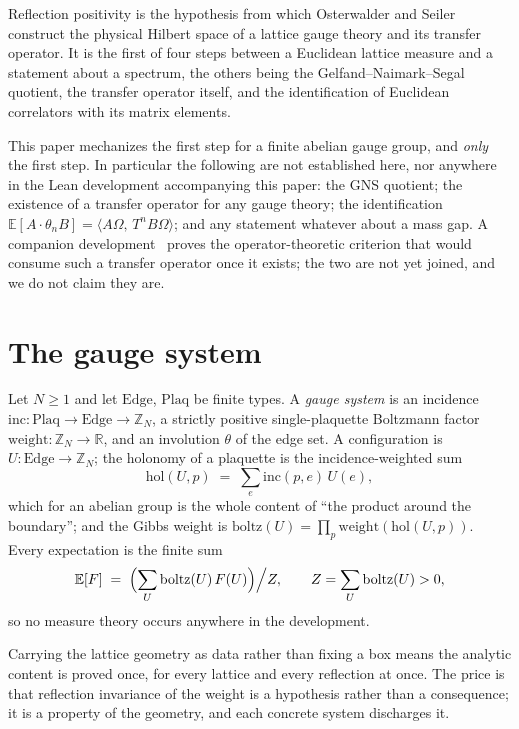 \documentclass[11pt]{article}
\theoremstyle{definition}
\newcommand{\R}{\mathbb{R}}
\newcommand{\Z}{\mathbb{Z}}
\newcommand{\inn}[2]{\langle #1,\, #2\rangle}
\begin{document}
Reflection positivity is the hypothesis from which Osterwalder and
Seiler~\cite{OsterwalderSeiler} construct the physical Hilbert space of a
lattice gauge theory and its transfer operator.  It is the first of four steps
between a Euclidean lattice measure and a statement about a spectrum, the
others being the Gelfand--Naimark--Segal quotient, the transfer operator
itself, and the identification of Euclidean correlators with its matrix
elements.

This paper mechanizes the first step for a finite abelian gauge group, and
\emph{only} the first step.  In particular the following are not established
here, nor anywhere in the Lean development accompanying this paper: the GNS
quotient; the existence of a transfer operator for any gauge theory; the
identification $\mathbb{E}[A\cdot\theta_n B] = \inn{A\Omega}{T^n B\Omega}$; and
any statement whatever about a mass gap.  A companion
development~\cite{ErikssonObridge} proves the operator-theoretic criterion that
would consume such a transfer operator once it exists; the two are not yet
joined, and we do not claim they are.

\section{The gauge system}

Let $N \ge 1$ and let $\mathrm{Edge}$, $\mathrm{Plaq}$ be finite types.  A
\emph{gauge system} is an incidence $\mathrm{inc} : \mathrm{Plaq} \to
\mathrm{Edge} \to \Z_N$, a strictly positive single-plaquette Boltzmann factor
$\mathrm{weight} : \Z_N \to \R$, and an involution $\theta$ of the edge set.  A
configuration is $U : \mathrm{Edge} \to \Z_N$; the holonomy of a plaquette is
the incidence-weighted sum
\[
  \mathrm{hol}(U,p) \;=\; \sum_{e} \mathrm{inc}(p,e)\,U(e),
\]
which for an abelian group is the whole content of ``the product around the
boundary''; and the Gibbs weight is
$\mathrm{boltz}(U) = \prod_p \mathrm{weight}(\mathrm{hol}(U,p))$.  Every
expectation is the finite sum
\[
  \mathbb{E}[F] \;=\; \Bigl(\sum_U \mathrm{boltz}(U)\,F(U)\Bigr)\Big/ Z,
  \qquad Z = \sum_U \mathrm{boltz}(U) > 0 ,
\]
so no measure theory occurs anywhere in the development.

Carrying the lattice geometry as data rather than fixing a box means the
analytic content is proved once, for every lattice and every reflection at
once.  The price is that reflection invariance of the weight is a hypothesis
rather than a consequence; it is a property of the geometry, and each concrete
system discharges it.
\end{document}
